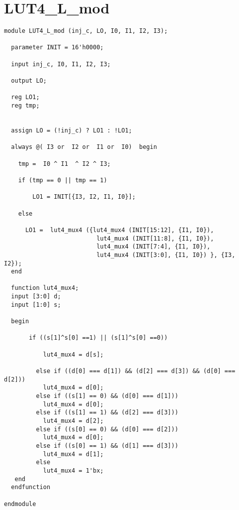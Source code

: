 \section{LUT4\_L\_mod}
\begin{lstlisting}
module LUT4_L_mod (inj_c, LO, I0, I1, I2, I3);

  parameter INIT = 16'h0000;

  input inj_c, I0, I1, I2, I3;

  output LO;

  reg LO1;
  reg tmp;

  
  assign LO = (!inj_c) ? LO1 : !LO1;
  
  always @( I3 or  I2 or  I1 or  I0)  begin
 
    tmp =  I0 ^ I1  ^ I2 ^ I3;

    if (tmp == 0 || tmp == 1)

        LO1 = INIT[{I3, I2, I1, I0}];

    else 
    
      LO1 =  lut4_mux4 ({lut4_mux4 (INIT[15:12], {I1, I0}),
                          lut4_mux4 (INIT[11:8], {I1, I0}),
                          lut4_mux4 (INIT[7:4], {I1, I0}),
                          lut4_mux4 (INIT[3:0], {I1, I0}) }, {I3, I2});
  end

  function lut4_mux4;
  input [3:0] d;
  input [1:0] s;
   
  begin

       if ((s[1]^s[0] ==1) || (s[1]^s[0] ==0))
           
           lut4_mux4 = d[s];

         else if ((d[0] === d[1]) && (d[2] === d[3]) && (d[0] === d[2])) 
           lut4_mux4 = d[0];
         else if ((s[1] == 0) && (d[0] === d[1]))
           lut4_mux4 = d[0];
         else if ((s[1] == 1) && (d[2] === d[3])) 
           lut4_mux4 = d[2];
         else if ((s[0] == 0) && (d[0] === d[2])) 
           lut4_mux4 = d[0];
         else if ((s[0] == 1) && (d[1] === d[3]))
           lut4_mux4 = d[1];
         else
           lut4_mux4 = 1'bx;
   end
  endfunction

endmodule
\end{lstlisting}

